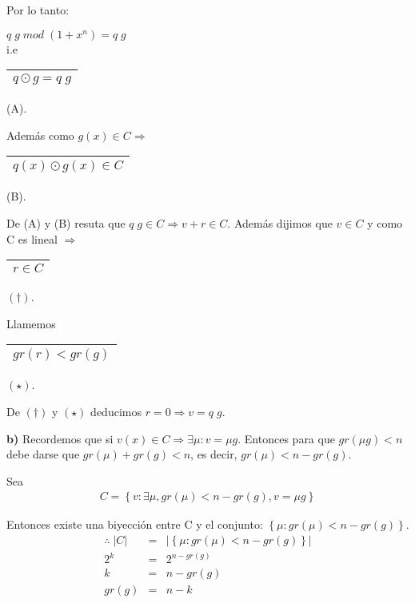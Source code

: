 \documentclass[12pt,a4paper]{report}
\begin{document}
			\vspace{3mm}
			\par Por lo tanto:
			\begin{center}
				$ q\; g \; mod \; (1 + x^{n}) = q \; g $ \\
				\vspace{3mm}
				i.e \begin{tabular}{|c|} \hline $ q \odot g = q \; g $ \\\hline \end{tabular} (A).
			\end{center}
			\par Además como $g(x) \in C \Rightarrow$ \begin{tabular}{|c|} \hline $q(x) \odot g(x) \in C $ \\ \hline \end{tabular} (B).

			\vspace{3mm}
			\par De (A) y (B) resuta que $q \; g \in C \Rightarrow v + r \in C$. Además dijimos que $v \in C$ y como C es lineal $\Rightarrow$ \begin{tabular}{|c|} \hline $r \in C$ \\\hline \end{tabular} $(\dag)$.
			\vspace{3mm}
			\par Llamemos \begin{tabular}{|c|} \hline $gr(r) < gr(g) $ \\ \hline \end{tabular} $(\star)$.

			\vspace{5mm}
			\par De $(\dag)$ y $(\star)$ deducimos $r = 0 \Rightarrow v = q \; g$.

			\vspace{5mm}
			\textbf{b)} Recordemos que si $ v(x) \in C \Rightarrow \exists \mu : v = \mu g$. Entonces para que $gr(\mu g) < n$ debe darse que $gr(\mu) + gr(g) < n$, es decir, $gr(\mu) < n - gr(g)$.

			\vspace{3mm}
			\par Sea
			\begin{eqnarray}
				\nonumber C = \left\lbrace v : \exists \mu, gr(\mu) < n - gr(g), v = \mu g \right\rbrace
			\end{eqnarray}

			\par Entonces existe una biyección entre C y el conjunto: $\left\lbrace \mu :  gr(\mu) < n - gr(g) \right\rbrace$.
			\begin{eqnarray}
				\nonumber \therefore \; \lvert C \rvert &=& \lvert \left\lbrace \mu : gr(\mu) < n - gr(g) \right\rbrace \rvert \\
				\nonumber 2^{k} &=& 2^{n - gr(g)} \\
				\nonumber k &=& n - gr(g) \\
				\nonumber gr(g) &=& n - k
			\end{eqnarray}
\end{document}
